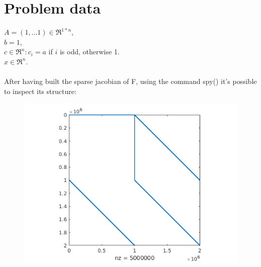 \documentclass[]{article}
\begin{document}
\section{Problem data}
$A=(1, \dots 1)\in \Re^{1*n}$, \\
$b = 1$,\\
$c \in \Re^n:c_i=a$ if $i$ is odd, otherwise 1.\\
$x \in \Re^n$.\\\\
After having built the sparse jacobian of F, using the command spy() it's possible to inspect its structure:

\begin{figure}[h]
	\includegraphics[width=12cm]{code/AA.png}
\end{figure}
\end{document}
